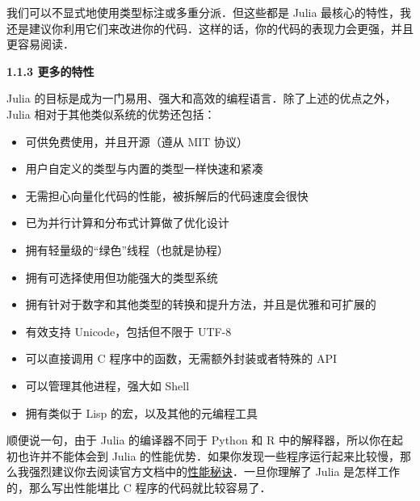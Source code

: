 我们可以不显式地使用类型标注或多重分派．但这些都是 Julia 最核心的特性，我还是建议你利用它们来改进你的代码．这样的话，你的代码的表现力会更强，并且更容易阅读．

\textbf{1.1.3 更多的特性}

Julia 的目标是成为一门易用、强大和高效的编程语言．除了上述的优点之外，Julia 相对于其他类似系统的优势还包括：

\begin{itemize}
\item 可供免费使用，并且开源（遵从 MIT 协议）
\item 用户自定义的类型与内置的类型一样快速和紧凑
\item 无需担心向量化代码的性能，被拆解后的代码速度会很快
\item 已为并行计算和分布式计算做了优化设计
\item 拥有轻量级的“绿色”线程（也就是协程）
\item 拥有可选择使用但功能强大的类型系统
\item 拥有针对于数字和其他类型的转换和提升方法，并且是优雅和可扩展的
\item 有效支持 Unicode，包括但不限于 UTF-8
\item 可以直接调用 C 程序中的函数，无需额外封装或者特殊的 API
\item 可以管理其他进程，强大如 Shell
\item 拥有类似于 Lisp 的宏，以及其他的元编程工具
\end{itemize}

顺便说一句，由于 Julia 的编译器不同于 Python 和 R 中的解释器，所以你在起初也许并不能体会到 Julia 的性能优势．如果你发现一些程序运行起来比较慢，那么我强烈建议你去阅读官方文档中的\href{https://docs.julialang.org/en/v1.3/manual/performance-tips/#man-performance-tips-1}{性能秘诀}．一旦你理解了 Julia 是怎样工作的，那么写出性能堪比 C 程序的代码就比较容易了．
